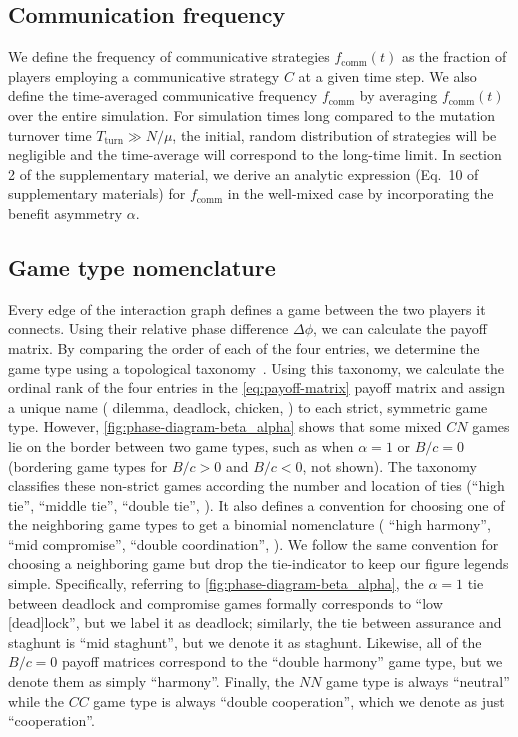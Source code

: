 \documentclass[pdflatex,lineno,referee,sn-nature]{sn-jnl}
\begin{document}
\subsection{Communication frequency}
We define the frequency of communicative strategies
$f_{\text{comm}}(t)$ as the fraction of players employing
a communicative strategy $C$ at a given time step.
We also define the time-averaged communicative frequency
$f_{\text{comm}}$
by averaging $f_{\text{comm}}(t)$ over the entire simulation.
For simulation times long compared to the mutation turnover time
$T_{\text{turn}} \gg N/\mu$,
the initial, random distribution of strategies will be negligible
and the time-average will correspond to the long-time limit.
In section 2 of the supplementary material,
we derive an analytic expression (Eq.\ 10 of supplementary materials) for
$f_{\text{comm}}$ in the well-mixed case
by incorporating the benefit asymmetry $\alpha$.

\subsection{Game type nomenclature}
\label{sec:game-type-nomenclature}
Every edge of the interaction graph
defines a game between the two players it connects.
Using their relative phase difference $\Delta \phi$,
we can calculate the payoff matrix.
By comparing the order of each of the four entries,
we determine the game type using
a topological taxonomy~\citep{bruns2015names}.
Using this taxonomy, we calculate the ordinal rank of the four entries
in the \cref{eq:payoff-matrix} payoff matrix
and assign a unique name (\eg{} dilemma, deadlock, chicken, \etc{})
to each strict, symmetric game type.
However, \cref{fig:phase-diagram-beta_alpha}
shows that some mixed $CN$ games lie on the border between two game types,
such as when $\alpha = 1$ or $B/c = 0$
(bordering game types for $B/c > 0$ and $B/c < 0$, not shown).
The taxonomy~\citep{bruns2015names} classifies these non-strict games
according the number and location of ties (``high tie'', ``middle tie'',
``double tie'', \etc{}).
It also defines a convention for choosing one of the neighboring game types
to get a binomial nomenclature (\eg{} ``high harmony'', ``mid compromise'',
``double coordination'', \etc{}).
We follow the same convention for choosing a neighboring game
but drop the tie-indicator to keep our figure legends simple.
Specifically, referring to \cref{fig:phase-diagram-beta_alpha},
the $\alpha = 1$ tie between deadlock and compromise games
formally corresponds to ``low [dead]lock'',
but we label it as deadlock;
similarly, the tie between assurance and staghunt
is ``mid staghunt'', but we denote it as staghunt.
Likewise, all of the $B/c = 0$ payoff matrices
correspond to the ``double harmony'' game type,
but we denote them as simply ``harmony''.
Finally, the $NN$ game type is always ``neutral''
while the $CC$ game type is always ``double cooperation'',
which we denote as just ``cooperation''.
\end{document}
